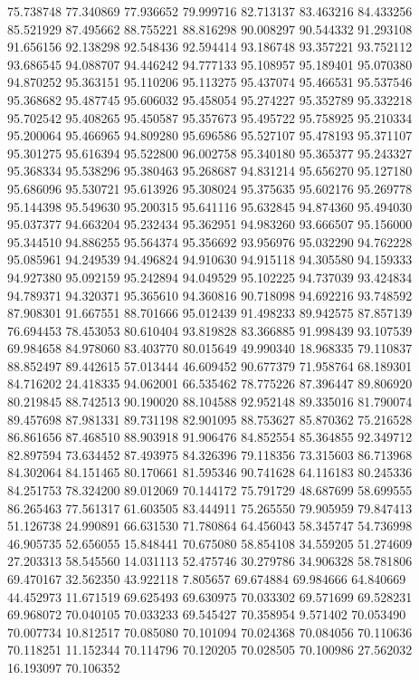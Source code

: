 75.738748
77.340869
77.936652
79.999716
82.713137
83.463216
84.433256
85.521929
87.495662
88.755221
88.816298
90.008297
90.544332
91.293108
91.656156
92.138298
92.548436
92.594414
93.186748
93.357221
93.752112
93.686545
94.088707
94.446242
94.777133
95.108957
95.189401
95.070380
94.870252
95.363151
95.110206
95.113275
95.437074
95.466531
95.537546
95.368682
95.487745
95.606032
95.458054
95.274227
95.352789
95.332218
95.702542
95.408265
95.450587
95.357673
95.495722
95.758925
95.210334
95.200064
95.466965
94.809280
95.696586
95.527107
95.478193
95.371107
95.301275
95.616394
95.522800
96.002758
95.340180
95.365377
95.243327
95.368334
95.538296
95.380463
95.268687
94.831214
95.656270
95.127180
95.686096
95.530721
95.613926
95.308024
95.375635
95.602176
95.269778
95.144398
95.549630
95.200315
95.641116
95.632845
94.874360
95.494030
95.037377
94.663204
95.232434
95.362951
94.983260
93.666507
95.156000
95.344510
94.886255
95.564374
95.356692
93.956976
95.032290
94.762228
95.085961
94.249539
94.496824
94.910630
94.915118
94.305580
94.159333
94.927380
95.092159
95.242894
94.049529
95.102225
94.737039
93.424834
94.789371
94.320371
95.365610
94.360816
90.718098
94.692216
93.748592
87.908301
91.667551
88.701666
95.012439
91.498233
89.942575
87.857139
76.694453
78.453053
80.610404
93.819828
83.366885
91.998439
93.107539
69.984658
84.978060
83.403770
80.015649
49.990340
18.968335
79.110837
88.852497
89.442615
57.013444
46.609452
90.677379
71.958764
68.189301
84.716202
24.418335
94.062001
66.535462
78.775226
87.396447
89.806920
80.219845
88.742513
90.190020
88.104588
92.952148
89.335016
81.790074
89.457698
87.981331
89.731198
82.901095
88.753627
85.870362
75.216528
86.861656
87.468510
88.903918
91.906476
84.852554
85.364855
92.349712
82.897594
73.634452
87.493975
84.326396
79.118356
73.315603
86.713968
84.302064
84.151465
80.170661
81.595346
90.741628
64.116183
80.245336
84.251753
78.324200
89.012069
70.144172
75.791729
48.687699
58.699555
86.265463
77.561317
61.603505
83.444911
75.265550
79.905959
79.847413
51.126738
24.990891
66.631530
71.780864
64.456043
58.345747
54.736998
46.905735
52.656055
15.848441
70.675080
58.854108
34.559205
51.274609
27.203313
58.545560
14.031113
52.475746
30.279786
34.906328
58.781806
69.470167
32.562350
43.922118
7.805657
69.674884
69.984666
64.840669
44.452973
11.671519
69.625493
69.630975
70.033302
69.571699
69.528231
69.968072
70.040105
70.033233
69.545427
70.358954
9.571402
70.053490
70.007734
10.812517
70.085080
70.101094
70.024368
70.084056
70.110636
70.118251
11.152344
70.114796
70.120205
70.028505
70.100986
27.562032
16.193097
70.106352
